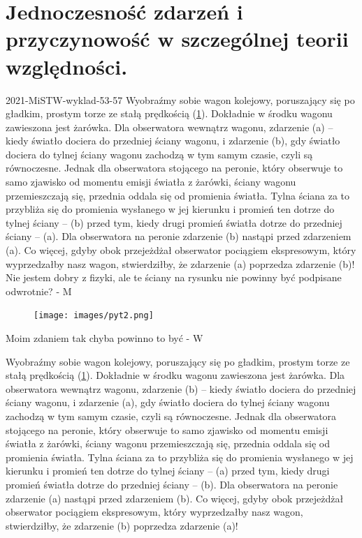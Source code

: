 \documentclass{article}
\begin{document}
\section{Jednoczesność zdarzeń i przyczynowość w szczególnej teorii względności.}
2021-MiSTW-wyklad-53-57
Wyobraźmy sobie wagon kolejowy, poruszający się po gładkim, prostym torze ze stałą prędkością (\ref{fig:pyt2}). Dokładnie w środku wagonu zawieszona jest żarówka. Dla obserwatora wewnątrz wagonu, zdarzenie (a) – kiedy światło dociera do przedniej ściany wagonu, i zdarzenie (b), gdy światło dociera do tylnej ściany wagonu zachodzą w tym samym czasie, czyli są równoczesne. Jednak dla obserwatora stojącego na peronie, który obserwuje to samo zjawisko od momentu emisji światła z żarówki, ściany wagonu przemieszczają się, przednia oddala się od promienia światła. Tylna ściana za to przybliża się do promienia wysłanego w jej kierunku i promień ten dotrze do tylnej ściany – (b) przed tym, kiedy drugi promień światła dotrze do przedniej ściany – (a). Dla obserwatora na peronie zdarzenie (b) nastąpi przed zdarzeniem (a). Co więcej, gdyby obok przejeżdżał obserwator pociągiem ekspresowym, który wyprzedzałby nasz wagon, stwierdziłby, że zdarzenie (a) poprzedza zdarzenie (b)!
Nie jestem dobry z fizyki, ale te ściany na rysunku nie powinny być podpisane odwrotnie? - M

\begin{figure}
    \centering
    \texttt{[image: images/pyt2.png]}
    \caption{}
    \label{fig:pyt2}
\end{figure}
Moim zdaniem tak chyba powinno to być - W

Wyobraźmy sobie wagon kolejowy, poruszający się po gładkim, prostym torze ze stałą prędkością (\ref{fig:pyt2}). Dokładnie w środku wagonu zawieszona jest żarówka. Dla obserwatora wewnątrz wagonu, zdarzenie (b) – kiedy światło dociera do przedniej ściany wagonu, i zdarzenie (a), gdy światło dociera do tylnej ściany wagonu zachodzą w tym samym czasie, czyli są równoczesne. Jednak dla obserwatora stojącego na peronie, który obserwuje to samo zjawisko od momentu emisji światła z żarówki, ściany wagonu przemieszczają się, przednia oddala się od promienia światła. Tylna ściana za to przybliża się do promienia wysłanego w jej kierunku i promień ten dotrze do tylnej ściany – (a) przed tym, kiedy drugi promień światła dotrze do przedniej ściany – (b). Dla obserwatora na peronie zdarzenie (a) nastąpi przed zdarzeniem (b). Co więcej, gdyby obok przejeżdżał obserwator pociągiem ekspresowym, który wyprzedzałby nasz wagon, stwierdziłby, że zdarzenie (b) poprzedza zdarzenie (a)!
\end{document}
